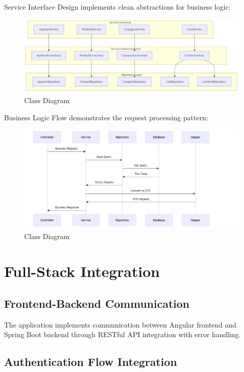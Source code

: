 \documentclass[12pt,a4paper]{article}
\begin{document}
Service Interface Design implements clean abstractions for business logic:

\begin{figure}[H]
    \centering
    \includegraphics[width=1.0\textwidth]{service.png}
    \caption{Class Diagram}
\end{figure}

Business Logic Flow demonstrates the request processing pattern:

\begin{figure}[H]
    \centering
    \includegraphics[width=1.0\textwidth]{seq.png}
    \caption{Class Diagram}
\end{figure}


\section{Full-Stack Integration}

\subsection{Frontend-Backend Communication}

The application implements communication between Angular frontend and Spring Boot backend through RESTful API integration with error handling.

\subsection{Authentication Flow Integration}
\end{document}
